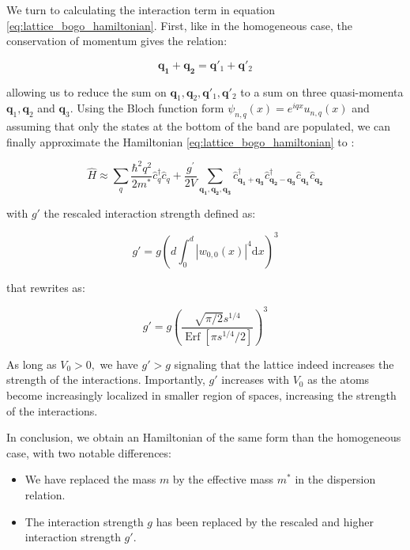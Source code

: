 \label{sec:rescaled_interaction}

We turn to calculating the interaction term in equation \ref{eq:lattice_bogo_hamiltonian}. First, like in the homogeneous case, the conservation of momentum gives the relation:

\begin{equation}
    \bm{q_1} + \bm{q_2} = \bm{q}'_1 + \bm{q}'_2
\end{equation}

\noindent allowing us to reduce the sum on $\bm{q}_1,\bm{q}_2, \bm{q}'_1, \bm{q}'_2$ to a sum on three quasi-momenta $\bm{q}_1,\bm{q}_2$ and $\bm{q}_3$. Using the Bloch function form $\psi_{n,q} (x)= e^{iqx} u_{n,q} (x)$ and assuming that only the states at the bottom of the band are populated, we can finally approximate the Hamiltonian \ref{eq:lattice_bogo_hamiltonian} to \cite{dalibard2013cages}:

\begin{equation}
    \hat{H} \approx \sum_{q} \frac{\hbar^{2} q^{2}}{2 m^{*}} \hat{c}_{q}^{\dagger} \hat{c}_{q}+\frac{g^{\prime}}{2 V} \sum_{\bm{q_{1}}, \bm{q_{2}}, \bm{q_{3}}} \hat{c}^{\dagger}_{\bm{q_1}+\bm{q_3}} \hat{c}^{\dagger}_{\bm{q_2}-\bm{q_3}} \hat{c}_{\bm{q_1}} \hat{c}_{\bm{q_2}} 
\end{equation}

\noindent with $g'$ the rescaled interaction strength defined as:

\begin{equation}
    g' = g \left(d \int_0^d |w_{0,0} (x)|^4 \mathrm{d}x \right)^3
\end{equation}

\noindent that rewrites as:

\begin{equation}
    g'=g\left(\frac{\sqrt{\pi / 2} s^{1 / 4}}{\operatorname{Erf}\left[\pi s^{1 / 4} / 2\right]}\right)^{3}
\end{equation} 

\noindent As long as $V_0 > 0,$ we have $g' > g$ signaling that the lattice indeed increases the strength of the interactions. Importantly, $g'$ increases with $V_0$ as the atoms become increasingly localized in smaller region of spaces, increasing the strength of the interactions.

In conclusion, we obtain an Hamiltonian of the same form than the homogeneous case, with two notable differences:

\begin{itemize}
    \item We have replaced the mass $m$ by the effective mass $m^*$ in the dispersion relation.
    \item The interaction strength $g$ has been replaced by the rescaled and higher interaction strength $g'$.
\end{itemize}

